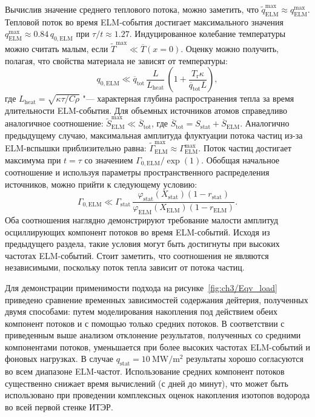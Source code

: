 Вычислив значение среднего теплового потока, можно заметить, что $\widetilde{q}_{\mathrm{ELM}}^{\max} \approx q_{\mathrm{ELM}}^{\max}$. Тепловой поток во время ELM-события достигает максимального значения $q_{\mathrm{ELM}}^{\max}\approx 0.84 \, q_{0,\mathrm{ELM}}$ при $\tau/t\approx 1.27$. Индуцированное колебание температуры можно считать малым, если $\widetilde{T}^{\max} \ll \overline{T}(x=0)$. Оценку можно получить, полагая, что свойства материала не зависят от температуры:
\begin{equation}
	\label{eq:heat_condition}
	q_{0,\mathrm{ELM}} \ll \overline{q}_{\mathrm{tot}}\,\frac{ L}{L_{\mathrm{heat}}}\,\left( 1+\frac{T_\mathrm{r}\kappa}{\overline{q}_{\mathrm{tot}}L}\right),
\end{equation}
где $L_{\mathrm{heat}}=\sqrt{\kappa\tau/C\rho}$ "--- характерная глубина распространения тепла за время длительности ELM-события. Для объемных источников атомов справедливо аналогичное соотношение: $\widetilde{S}^{\max}_{\mathrm{ELM}} \ll \overline{S}_{\mathrm{tot}}$, где $\overline{S}_{\mathrm{tot}}=S_{\mathrm{stat}}+\overline{S}_{\mathrm{ELM}}$. Аналогично предыдущему случаю, максимальная амплитуда флуктуации потока частиц из-за ELM-вспышки приблизительно равна: $\widetilde{\Gamma}_{\mathrm{ELM}}^{\max} \approx \Gamma_{\mathrm{ELM}}^{\max}$. Поток частиц достигает максимума при $t=\tau$ со значением $\Gamma_{0,\mathrm{ELM}}/\exp(1)$. Обобщая начальное соотношение и используя параметры пространственного распределения источников, можно прийти к следующему условию:
\begin{equation}
	\label{eq:flux_condition}
	\Gamma_{0,\mathrm{ELM}} \ll \Gamma_{\mathrm{stat}}\,\frac{\varphi_{\mathrm{stat}}(X_\mathrm{stat})(1-r_{\mathrm{stat}})}{\varphi_{\mathrm{ELM}}(X_\mathrm{ELM})(1-r_{\mathrm{ELM}})}.
\end{equation}
Оба соотношения наглядно демонстрируют требование малости амплитуд осциллирующих компонент потоков во время ELM-событий. Исходя из предыдущего раздела, такие условия могут быть достигнуты при высоких частотах ELM-событий. Стоит заметить, что соотношения не являются независимыми, поскольку поток тепла зависит от потока частиц.

Для демонстрации применимости подхода на рисунке~\cref{fig:ch3/Eqv_load} приведено сравнение временных зависимостей содержания дейтерия, полученных двумя способами: путем моделирования накопления под действием обеих компонент потоков и с помощью только средних потоков. В соответствии с приведенным выше анализом отклонение результатов, полученных со средними компонентами потоков, уменьшается при более высоких частотах ELM-событий и фоновых нагрузках. В случае $q_{\mathrm{stat}}=\SI{10}{\mega\watt\per\meter\squared}$ результаты хорошо согласуются во всем диапазоне ELM-частот. Использование средних компонент потоков существенно снижает время вычислений (с дней до минут), что может быть использовано при проведении комплексных оценок накопления изотопов водорода во всей первой стенке ИТЭР.

